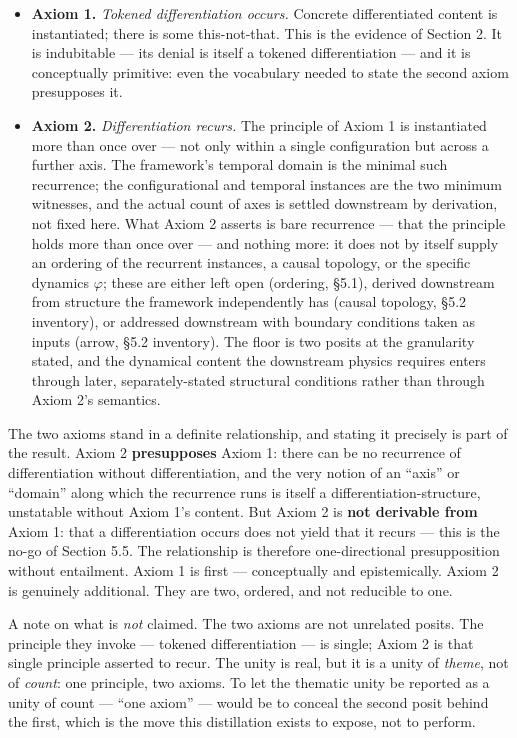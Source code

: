 \documentclass[
]{article}
\providecommand{\tightlist}{%
  \setlength{\itemsep}{0pt}\setlength{\parskip}{0pt}}
\begin{document}
\begin{itemize}
\tightlist
\item
  \textbf{Axiom 1.} \emph{Tokened differentiation occurs.} Concrete
  differentiated content is instantiated; there is some this-not-that.
  This is the evidence of Section 2. It is indubitable --- its denial is
  itself a tokened differentiation --- and it is conceptually primitive:
  even the vocabulary needed to state the second axiom presupposes it.
\item
  \textbf{Axiom 2.} \emph{Differentiation recurs.} The principle of
  Axiom 1 is instantiated more than once over --- not only within a
  single configuration but across a further axis. The framework's
  temporal domain is the minimal such recurrence; the configurational
  and temporal instances are the two minimum witnesses, and the actual
  count of axes is settled downstream by derivation, not fixed here.
  What Axiom 2 asserts is bare recurrence --- that the principle holds
  more than once over --- and nothing more: it does not by itself supply
  an ordering of the recurrent instances, a causal topology, or the
  specific dynamics \(\varphi\); these are either left open (ordering,
  §5.1), derived downstream from structure the framework independently
  has (causal topology, §5.2 inventory), or addressed downstream with
  boundary conditions taken as inputs (arrow, §5.2 inventory). The floor
  is two posits at the granularity stated, and the dynamical content the
  downstream physics requires enters through later, separately-stated
  structural conditions rather than through Axiom 2's semantics.
\end{itemize}

The two axioms stand in a definite relationship, and stating it
precisely is part of the result. Axiom 2 \textbf{presupposes} Axiom 1:
there can be no recurrence of differentiation without differentiation,
and the very notion of an ``axis'' or ``domain'' along which the
recurrence runs is itself a differentiation-structure, unstatable
without Axiom 1's content. But Axiom 2 is \textbf{not derivable from}
Axiom 1: that a differentiation occurs does not yield that it recurs ---
this is the no-go of Section 5.5. The relationship is therefore
one-directional presupposition without entailment. Axiom 1 is first ---
conceptually and epistemically. Axiom 2 is genuinely additional. They
are two, ordered, and not reducible to one.

A note on what is \emph{not} claimed. The two axioms are not unrelated
posits. The principle they invoke --- tokened differentiation --- is
single; Axiom 2 is that single principle asserted to recur. The unity is
real, but it is a unity of \emph{theme}, not of \emph{count}: one
principle, two axioms. To let the thematic unity be reported as a unity
of count --- ``one axiom'' --- would be to conceal the second posit
behind the first, which is the move this distillation exists to expose,
not to perform.
\end{document}
